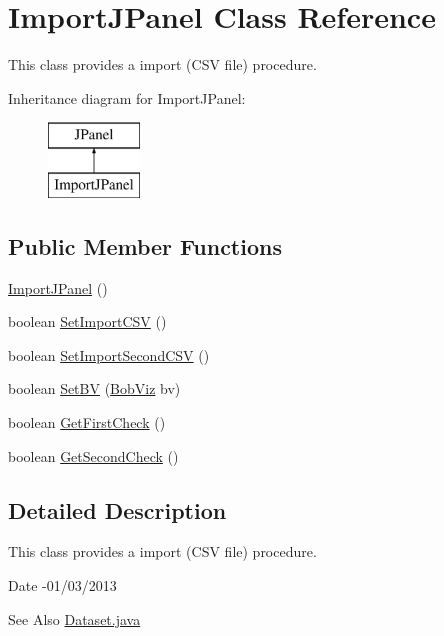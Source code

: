 \hypertarget{class_import_j_panel}{\section{Import\-J\-Panel Class Reference}
\label{class_import_j_panel}
}


This class provides a import (C\-S\-V file) procedure.  


Inheritance diagram for Import\-J\-Panel\-:\begin{figure}[H]
\begin{center}
\leavevmode
\includegraphics[height=2.000000cm]{class_import_j_panel}
\end{center}
\end{figure}
\subsection*{Public Member Functions}
\begin{DoxyCompactItemize}
\item 
\hyperlink{class_import_j_panel_af9586e0f15e12d4358ee009fcd4192fa}{Import\-J\-Panel} ()
\item 
boolean \hyperlink{class_import_j_panel_aebc2247f219f26a2a4f51d297b82134f}{Set\-Import\-C\-S\-V} ()
\item 
boolean \hyperlink{class_import_j_panel_a2b16a63729e57fdffbcbb42806554929}{Set\-Import\-Second\-C\-S\-V} ()
\item 
boolean \hyperlink{class_import_j_panel_afea28d8fd4cbe3b480a93a4e7121a41d}{Set\-B\-V} (\hyperlink{class_bob_viz}{Bob\-Viz} bv)
\item 
boolean \hyperlink{class_import_j_panel_a9b488ed902bf925d4f48ed5052614f75}{Get\-First\-Check} ()
\item 
boolean \hyperlink{class_import_j_panel_a58a46639a66bbf6ccd78f9a826b7bf81}{Get\-Second\-Check} ()
\end{DoxyCompactItemize}


\subsection{Detailed Description}
This class provides a import (C\-S\-V file) procedure. 

\begin{DoxyDate}{Date}
-\/01/03/2013 
\end{DoxyDate}
\begin{DoxySeeAlso}{See Also}
\hyperlink{_dataset_8java}{Dataset.\-java} 
\end{DoxySeeAlso}


